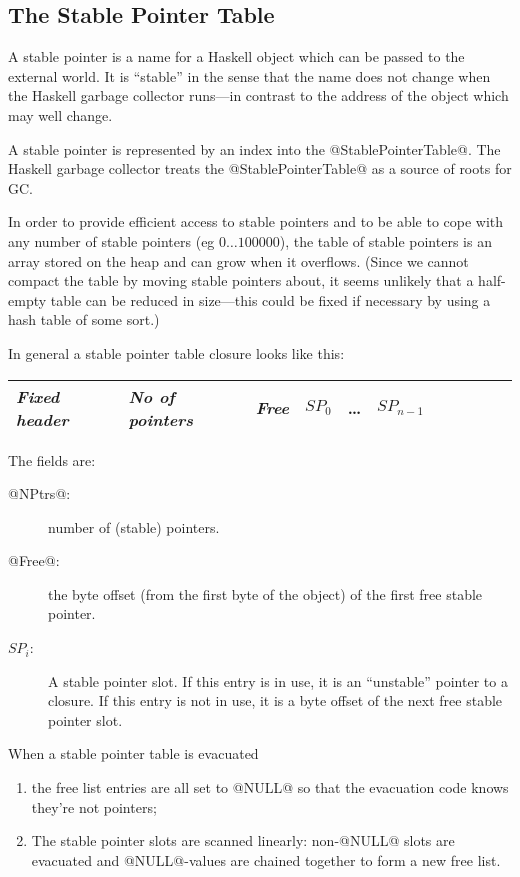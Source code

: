 \documentclass[11pt]{article}
\newcommand{\Subsection}[2]{\subsection{#1}\label{sec:#2}}
\begin{document}
\Subsection{The Stable Pointer Table}{STABLEPTR_TABLE}

A stable pointer is a name for a Haskell object which can be passed to
the external world.  It is ``stable'' in the sense that the name does
not change when the Haskell garbage collector runs---in contrast to
the address of the object which may well change.

A stable pointer is represented by an index into the
@StablePointerTable@.  The Haskell garbage collector treats the
@StablePointerTable@ as a source of roots for GC.

In order to provide efficient access to stable pointers and to be able
to cope with any number of stable pointers (eg $0 \ldots 100000$), the
table of stable pointers is an array stored on the heap and can grow
when it overflows.  (Since we cannot compact the table by moving
stable pointers about, it seems unlikely that a half-empty table can
be reduced in size---this could be fixed if necessary by using a
hash table of some sort.)

In general a stable pointer table closure looks like this:

\begin{center}
\begin{tabular}{|l|l|l|l|l|l|l|l|l|l|l|}
\hline
\emph{Fixed header} & \emph{No of pointers} & \emph{Free} & $SP_0$ & \ldots & $SP_{n-1}$ 
\\\hline
\end{tabular}
\end{center}

The fields are:
\begin{description}

\item[@NPtrs@:] number of (stable) pointers.

\item[@Free@:] the byte offset (from the first byte of the object) of the first free stable pointer.

\item[$SP_i$:] A stable pointer slot.  If this entry is in use, it is
an ``unstable'' pointer to a closure.  If this entry is not in use, it
is a byte offset of the next free stable pointer slot.

\end{description}

When a stable pointer table is evacuated
\begin{enumerate}
\item the free list entries are all set to @NULL@ so that the evacuation
  code knows they're not pointers;

\item The stable pointer slots are scanned linearly: non-@NULL@ slots
are evacuated and @NULL@-values are chained together to form a new free list.
\end{enumerate}
\end{document}
